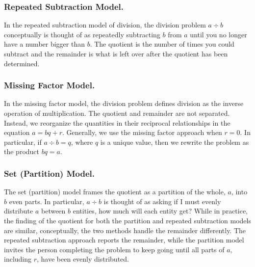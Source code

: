 \documentclass[
]{book}
\theoremstyle{definition}
\theoremstyle{definition}
\theoremstyle{definition}
\theoremstyle{remark}
\begin{document}
\hypertarget{repeated-subtraction-model.}{%
\subsubsection*{Repeated Subtraction Model.}\label{repeated-subtraction-model.}}

In the repeated subtraction model of division, the division problem \(a\div b\) conceptually is thought of as repeatedly subtracting \(b\) from \(a\) until you no longer have a number bigger than \(b\). The quotient is the number of times you could subtract and the remainder is what is left over after the quotient has been determined.

\hypertarget{missing-factor-model.}{%
\subsubsection*{Missing Factor Model.}\label{missing-factor-model.}}

In the missing factor model, the division problem defines division as the inverse operation of multiplication. The quotient and remainder are not separated. Instead, we reorganize the quantities in their reciprocal relationships in the equation \(a=bq+r\). Generally, we use the missing factor approach when \(r=0\). In particular, if \(a\div b = q\), where \(q\) is a unique value, then we rewrite the problem as the product \(bq=a\).

\hypertarget{set-partition-model.}{%
\subsubsection*{Set (Partition) Model.}\label{set-partition-model.}}

The set (partition) model frames the quotient as a partition of the whole, \(a\), into \(b\) even parts. In particular, \(a\div b\) is thought of as asking if I must evenly distribute \(a\) between \(b\) entities, how much will each entity get? While in practice, the finding of the quotient for both the partition and repeated subtraction models are similar, conceptually, the two methods handle the remainder differently. The repeated subtraction approach reports the remainder, while the partition model invites the person completing the problem to keep going until all parts of \(a\), including \(r\), have been evenly distributed.
\end{document}
